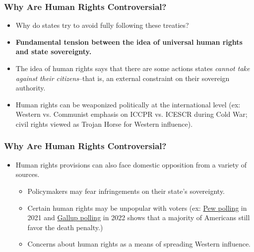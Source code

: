 \documentclass{beamer}
\begin{document}
\begin{frame} 
	\frametitle{\LARGE{Why Are Human Rights Controversial?}}
	\begin{itemize}
		\item Why do states try to avoid fully following these treaties?
		\item \textbf{Fundamental tension between the idea of universal human rights and state sovereignty.} \pause
		\item The idea of human rights says that there are some actions states \textit{cannot take against their citizens}--that is, an external constraint on their sovereign authority. \pause
		\item Human rights can be weaponized politically at the international level (ex: Western vs. Communist emphasis on ICCPR vs. ICESCR during Cold War; civil rights viewed as Trojan Horse for Western influence).
	\end{itemize}
\end{frame}

\begin{frame} 
	\frametitle{\LARGE{Why Are Human Rights Controversial?}}
	\begin{itemize}
		\item Human rights provisions can also face domestic opposition from a variety of sources. \pause
		\begin{itemize}
			\item Policymakers may fear infringements on their state's sovereignty. \pause
			\item Certain human rights may be unpopular with voters (ex: \href{https://www.pewresearch.org/politics/2021/06/02/most-americans-favor-the-death-penalty-despite-concerns-about-its-administration/}{Pew polling} in 2021 and \href{https://news.gallup.com/poll/404975/steady-americans-support-death-penalty-murderers.aspx}{Gallup polling} in 2022 shows that a majority of Americans still favor the death penalty.) \pause
			\item Concerns about human rights as a means of spreading Western influence.
			
		\end{itemize}
	\end{itemize}
\end{frame}
\end{document}
